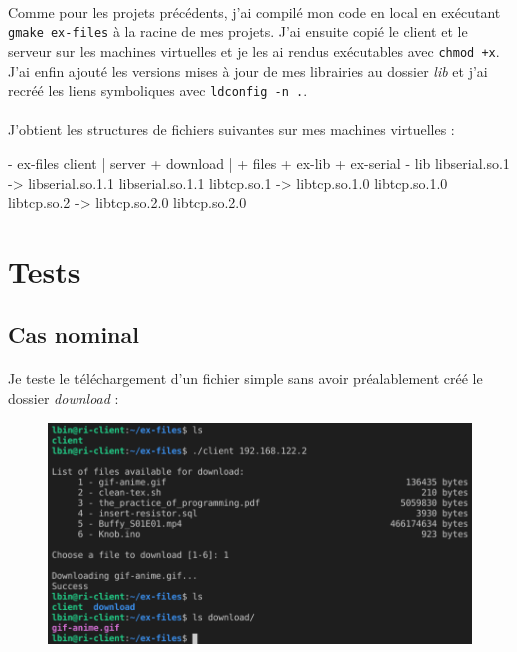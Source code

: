 \documentclass{article}
\begin{document}
    \paragraph{}
    Comme pour les projets précédents, j'ai compilé mon code en local en exécutant \texttt{gmake ex-files} à la racine de mes projets. J'ai ensuite copié le client et le serveur sur les machines virtuelles et je les ai rendus exécutables avec \texttt{chmod +x}. J'ai enfin ajouté les versions mises à jour de mes librairies au dossier \emph{lib} et j'ai recréé les liens symboliques avec \texttt{ldconfig -n .}.

    \paragraph{}
    J'obtient les structures de fichiers suivantes sur mes machines virtuelles :
    \begin{verbatimtab}
        - ex-files
            client     | server
            + download | + files
        + ex-lib
        + ex-serial
        - lib
            libserial.so.1 -> libserial.so.1.1
            libserial.so.1.1
            libtcp.so.1 -> libtcp.so.1.0
            libtcp.so.1.0
            libtcp.so.2 -> libtcp.so.2.0
            libtcp.so.2.0
    \end{verbatimtab}

    \section{Tests}
    \subsection{Cas nominal}
    \paragraph{}
    Je teste le téléchargement d'un fichier simple sans avoir préalablement créé le dossier \emph{download} :
    \begin{figure}[H]
        \centering
        \includegraphics[width=.7\textwidth]{./screenshots/cas-nominal-client.png}
    \end{figure}
\end{document}
